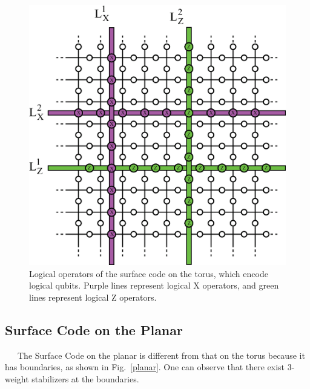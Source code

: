 \documentclass[a4paper,11pt]{ltjsarticle}
\begin{document}
{{    \begin{figure}[h]
        \centering
        \includegraphics[scale=0.40]{figure/logical_operator.eps}
        \vspace{0pt}\caption{Logical operators of the surface code on the torus, which encode logical qubits. Purple lines represent logical X operators, and green lines represent logical Z operators.}
        \label{logical_operator}
    \end{figure}
    }


    \subsection{Surface Code on the Planar}{
        \ \ \ The Surface Code on the planar is different from that on the torus because it has boundaries, as shown in Fig.~\ref{planar}. One can observe that there exist 3-weight stabilizers at the boundaries. 

}}
\end{document}

